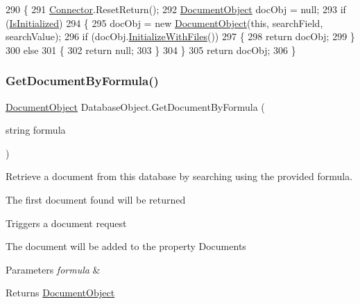 \begin{DoxyCode}
290     \{
291         \mbox{\hyperlink{class_connector}{Connector}}.ResetReturn();
292         \mbox{\hyperlink{class_document_object}{DocumentObject}} docObj = null;
293         \textcolor{keywordflow}{if} (\mbox{\hyperlink{class_database_object_a5fe036d32a30eb10d1b3f6a30263f740}{IsInitialized}})
294         \{
295             docObj = \textcolor{keyword}{new} \mbox{\hyperlink{class_document_object}{DocumentObject}}(\textcolor{keyword}{this}, searchField, searchValue);
296             \textcolor{keywordflow}{if} (docObj.\mbox{\hyperlink{class_document_object_a83f0e855adc5fb7afd02d2e34767f5c8}{InitializeWithFiles}}())
297             \{
298                 \textcolor{keywordflow}{return} docObj;
299             \}
300             \textcolor{keywordflow}{else}
301             \{
302                 \textcolor{keywordflow}{return} null;
303             \}
304         \}
305         \textcolor{keywordflow}{return} docObj;
306     \}
\end{DoxyCode}
\mbox{\label{class_database_object_ae5477aedfcd0d54b21017faa1389bc71}} 
\subsubsection{\texorpdfstring{Get\+Document\+By\+Formula()}{GetDocumentByFormula()}}
{\footnotesize\ttfamily \mbox{\hyperlink{class_document_object}{Document\+Object}} Database\+Object.\+Get\+Document\+By\+Formula (\begin{DoxyParamCaption}\item[{string}]{formula }\end{DoxyParamCaption})}



Retrieve a document from this database by searching using the provided formula. 

The first document found will be returned

Triggers a document request

The document will be added to the property \textquotesingle{}Documents\textquotesingle{}


\begin{DoxyParams}{Parameters}
{\em formula} & \\
\hline
\end{DoxyParams}
\begin{DoxyReturn}{Returns}
\mbox{\hyperlink{class_document_object}{Document\+Object}}
\end{DoxyReturn}


